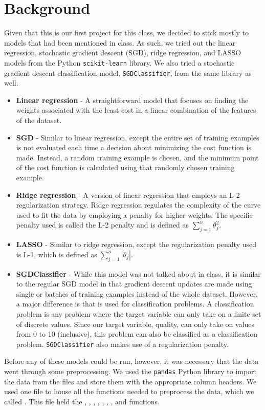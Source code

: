 
\section{Background}
\label{sec:background}
Given that this is our first project for this class, we decided to stick mostly to models that had been mentioned in class. As such, we tried out the linear regression, stochastic gradient descent (SGD), ridge regression, and LASSO models from the Python \texttt{scikit-learn} library. We also tried a stochastic gradient descent classification model, \texttt{SGDClassifier}, from the same library as well.
\begin{itemize}
    \item \textbf{Linear regression} - A straightforward model that focuses on finding the weights associated with the least cost in a linear combination of the features of the dataset. 
    \item \textbf{SGD} - Similar to linear regression, except the entire set of training examples is not evaluated each time a decision about minimizing the cost function is made. Instead, a random training example is chosen, and the minimum point of the cost function is calculated using that randomly chosen training example.
    \item \textbf{Ridge regression} - A version of linear regression that employs an L-2 regularization strategy. Ridge regression regulates the complexity of the curve used to fit the data by employing a penalty for higher weights. The specific penalty used is called the L-2 penalty and is defined as $\sum_{j=1}^{n} \theta_{j}^{2}$.
    \item \textbf{LASSO} - Similar to ridge regression, except the regularization penalty used is L-1, which is defined as $\sum_{j=1}^{n} |\theta_{j}|$.
    \item \textbf{SGDClassifier} - While this model was not talked about in class, it is similar to the regular SGD model in that gradient descent updates are made using single or batches of training examples instead of the whole dataset. However, a major difference is that  is used for classification problems. A classification problem is any problem where the target variable can only take on a finite set of discrete values. Since our target variable, quality, can only take on values from 0 to 10 (inclusive), this problem can also be classified as a classification problem. \texttt{SGDClassifier} also makes use of a regularization penalty.
\end{itemize}
Before any of these models could be run, however, it was necessary that the data went through some preprocessing. We used the \texttt{pandas} Python library to import the data from the files and store them with the appropriate column headers. We used one file to house all the functions needed to preprocess the data, which we called . This file held the , , , , , , , and  functions. 
